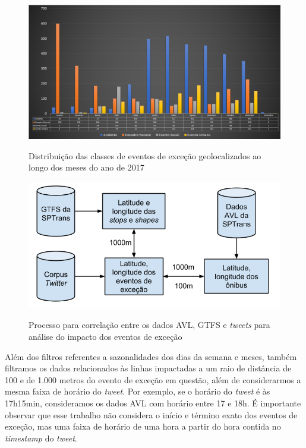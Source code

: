 \documentclass[
	12pt,				%
	oneside,			%
	a4paper,			%
	english,			%
	brazil				%
	]{abntex2ppgsi}
\begin{document}
{{{\begin{figure}[!htb]
	\centering
 	  \caption{Distribuição das classes de eventos de exceção geolocalizados ao longo dos meses do ano de 2017}
		\includegraphics[width=1\linewidth]{images/exception_events_classification_distribution_pt.png}
	\label{fig:exception_events_classification_distribution}
\end{figure}

\begin{figure}[!htb]
	\centering
 	  \caption{Processo para correlação entre os dados AVL, GTFS e \textit{tweets} para análise do impacto dos eventos de exceção}
		\includegraphics[width=0.7\linewidth]{images/avl_tweets_correlation_pt.png}
	\label{fig:avl_tweets_correlation_pt}
\end{figure}

Além dos filtros referentes a sazonalidades dos dias da semana e meses, também filtramos os dados relacionados às linhas impactadas a um raio de distância de 100 e de 1.000 metros do evento de exceção em questão, além de considerarmos a mesma faixa de horário do \textit{tweet}. Por exemplo, se o horário do \textit{tweet} é às 17h15min, consideramos os dados AVL com horário entre 17 e 18h. É importante observar que esse trabalho não considera o início e término exato dos eventos de exceção, mas uma faixa de horário de uma hora a partir do hora contida no \textit{timestamp}  do \textit{tweet}.

}}}
\end{document}
